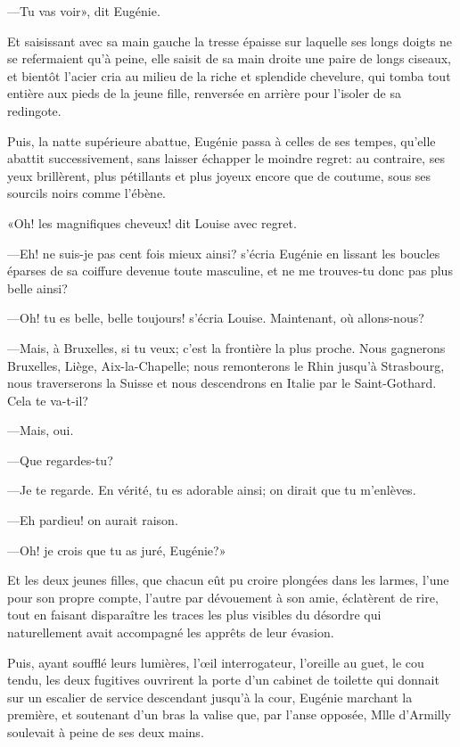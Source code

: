 —Tu vas voir», dit Eugénie. 

Et saisissant avec sa main gauche la tresse épaisse sur laquelle ses longs doigts ne se refermaient qu'à peine, elle saisit de sa main droite une paire de longs ciseaux, et bientôt l'acier cria au milieu de la riche et splendide chevelure, qui tomba tout entière aux pieds de la jeune fille, renversée en arrière pour l'isoler de sa redingote. 

Puis, la natte supérieure abattue, Eugénie passa à celles de ses tempes, qu'elle abattit successivement, sans laisser échapper le moindre regret: au contraire, ses yeux brillèrent, plus pétillants et plus joyeux encore que de coutume, sous ses sourcils noirs comme l'ébène. 

«Oh! les magnifiques cheveux! dit Louise avec regret. 

—Eh! ne suis-je pas cent fois mieux ainsi? s'écria Eugénie en lissant les boucles éparses de sa coiffure devenue toute masculine, et ne me trouves-tu donc pas plus belle ainsi? 

—Oh! tu es belle, belle toujours! s'écria Louise. Maintenant, où allons-nous? 

—Mais, à Bruxelles, si tu veux; c'est la frontière la plus proche. Nous gagnerons Bruxelles, Liège, Aix-la-Chapelle; nous remonterons le Rhin jusqu'à Strasbourg, nous traverserons la Suisse et nous descendrons en Italie par le Saint-Gothard. Cela te va-t-il? 

—Mais, oui. 

—Que regardes-tu? 

—Je te regarde. En vérité, tu es adorable ainsi; on dirait que tu m'enlèves. 

—Eh pardieu! on aurait raison. 

—Oh! je crois que tu as juré, Eugénie?» 

Et les deux jeunes filles, que chacun eût pu croire plongées dans les larmes, l'une pour son propre compte, l'autre par dévouement à son amie, éclatèrent de rire, tout en faisant disparaître les traces les plus visibles du désordre qui naturellement avait accompagné les apprêts de leur évasion. 

Puis, ayant soufflé leurs lumières, l'œil interrogateur, l'oreille au guet, le cou tendu, les deux fugitives ouvrirent la porte d'un cabinet de toilette qui donnait sur un escalier de service descendant jusqu'à la cour, Eugénie marchant la première, et soutenant d'un bras la valise que, par l'anse opposée, Mlle d'Armilly soulevait à peine de ses deux mains. 

